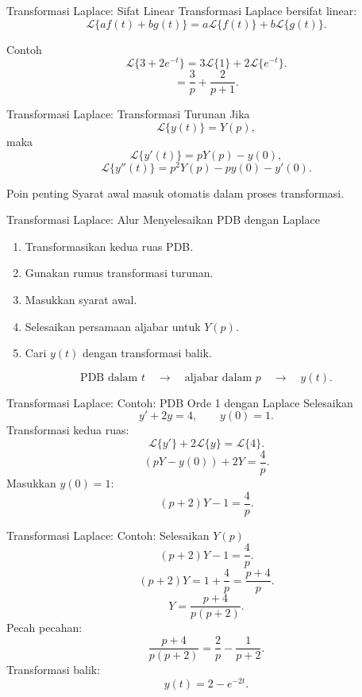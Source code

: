 \documentclass[aspectratio=169,11pt]{beamer}
\newcommand{\Lap}{\mathcal{L}}
\begin{document}
\begin{frame}{Transformasi Laplace: Sifat Linear}
Transformasi Laplace bersifat linear:
\[
\Lap\{af(t)+bg(t)\}=a\Lap\{f(t)\}+b\Lap\{g(t)\}.
\]
\begin{exampleblock}{Contoh}
\[
\Lap\{3+2e^{-t}\}=3\Lap\{1\}+2\Lap\{e^{-t}\}.
\]
\[
=\frac{3}{p}+\frac{2}{p+1}.
\]
\end{exampleblock}
\end{frame}

\begin{frame}{Transformasi Laplace: Transformasi Turunan}
Jika
\[
\Lap\{y(t)\}=Y(p),
\]
maka
\[
\Lap\{y'(t)\}=pY(p)-y(0),
\]
\[
\Lap\{y''(t)\}=p^2Y(p)-py(0)-y'(0).
\]
\begin{alertblock}{Poin penting}
Syarat awal masuk otomatis dalam proses transformasi.
\end{alertblock}
\end{frame}

\begin{frame}{Transformasi Laplace: Alur Menyelesaikan PDB dengan Laplace}
\begin{enumerate}
  \item Transformasikan kedua ruas PDB.
  \item Gunakan rumus transformasi turunan.
  \item Masukkan syarat awal.
  \item Selesaikan persamaan aljabar untuk $Y(p)$.
  \item Cari $y(t)$ dengan transformasi balik.
\end{enumerate}
\[
\boxed{\text{PDB dalam }t \quad \longrightarrow \quad \text{aljabar dalam }p \quad \longrightarrow \quad y(t).}
\]
\end{frame}

\begin{frame}{Transformasi Laplace: Contoh: PDB Orde 1 dengan Laplace}
Selesaikan
\[
y'+2y=4,\qquad y(0)=1.
\]
Transformasi kedua ruas:
\[
\Lap\{y'\}+2\Lap\{y\}=\Lap\{4\}.
\]
\[
(pY-y(0))+2Y=\frac{4}{p}.
\]
Masukkan $y(0)=1$:
\[
(p+2)Y-1=\frac{4}{p}.
\]
\end{frame}

\begin{frame}{Transformasi Laplace: Contoh: Selesaikan $Y(p)$}
\[
(p+2)Y-1=\frac{4}{p}.
\]
\[
(p+2)Y=1+\frac{4}{p}=\frac{p+4}{p}.
\]
\[
Y=\frac{p+4}{p(p+2)}.
\]
Pecah pecahan:
\[
\frac{p+4}{p(p+2)}=\frac{2}{p}-\frac{1}{p+2}.
\]
Transformasi balik:
\[
\boxed{y(t)=2-e^{-2t}.}
\]
\end{frame}
\end{document}
